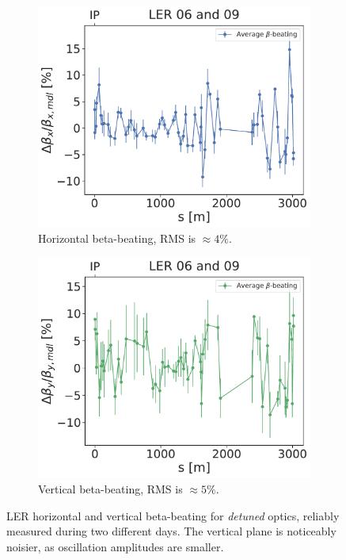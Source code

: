 
\begin{figure}[!htb]
    \centering
    \begin{subfigure}[b]{0.48\textwidth}
        \includegraphics[width=\linewidth]{images/kek/ler_06_09_bet_x.pdf}
        \caption{Horizontal beta-beating, RMS is $\approx 4\%$.}
    \end{subfigure}
    \hfill
    \begin{subfigure}[b]{0.48\textwidth}
        \includegraphics[width=\linewidth]{images/kek/ler_06_09_bet_y.pdf}
        \caption{Vertical beta-beating, RMS is $\approx 5\%$.}
    \end{subfigure}
    \caption{LER horizontal and vertical beta-beating for \textit{detuned} optics, reliably measured
    during two different days. The vertical plane is noticeably noisier, as oscillation amplitudes
    are smaller.}
    \label{fig:kek:beating_ler_detuned}
\end{figure}

